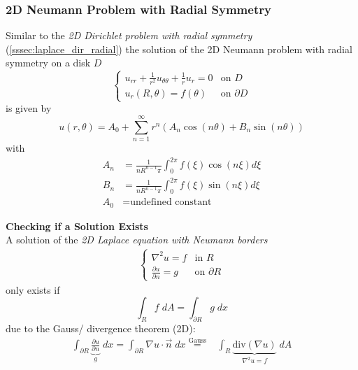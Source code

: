 \subsubsection{2D Neumann Problem with Radial Symmetry}\label{sssec:laplace_neu_rad}
Similar to the \textit{2D Dirichlet problem with radial symmetry} (\ref{sssec:laplace_dir_radial})
the solution of the 2D Neumann problem with radial symmetry on a disk $D$
\begin{equation*}
    \begin{cases}
        u_{rr} + \frac{1}{r^2}u_{\theta\theta}+\frac{1}{r}u_r = 0 & \text{on } D          \\
        u_r(R,\theta)=f(\theta)                                   & \text{on } \partial D
    \end{cases}
\end{equation*}
is given by
\begin{equation*}
    u(r,\theta)=A_0+\sum_{n=1}^\infty r^n(A_n\cos(n\theta)+B_n\sin(n\theta))
\end{equation*}
with
\begin{align*}
    A_n & =\frac{1}{nR^{n-1}\pi}\int_{0}^{2\pi}f(\xi)\cos(n\xi)d\xi \\
    B_n & =\frac{1}{nR^{n-1}\pi}\int_{0}^{2\pi}f(\xi)\sin(n\xi)d\xi \\
    A_0 & = \text{undefined constant}
\end{align*}

\textbf{Checking if a Solution Exists}\\
A solution of the \textit{2D Laplace equation with Neumann borders}
\begin{align*}
    \begin{cases}
        \nabla^2u=f                       & \text{in } R          \\
        \frac{\partial u}{\partial n} = g & \text{on } \partial R
    \end{cases}
\end{align*}
only exists if
\begin{equation*}
    \int_R f \;dA = \int_{\partial R} g \;dx
\end{equation*}
due to the Gauss/ divergence theorem (2D):
\begin{align*}
    \int_{\partial R} \underbrace{\frac{\partial u}{\partial n}}_{g}  \; dx
    =\int_{\partial R} \nabla u\cdot\vec{n}\; dx \overset{\text{Gauss}}{=} & \int_R \underbrace{\text{div}(\nabla u)}_{\nabla^2 u=f}\; dA
\end{align*}

